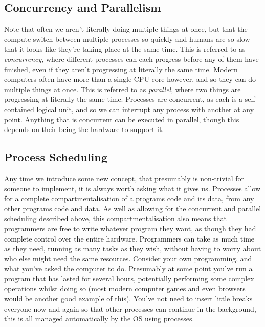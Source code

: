 \subsection{Concurrency and Parallelism}

Note that often we aren't literally doing multiple things at once, but that the compute switch between multiple processes so quickly and humans are so slow that it looks like they're taking place at the same time. This is referred to as \textit{concurrency}, where different processes can each progress before any of them have finished, even if they aren't progressing at literally the same time. Modern computers often have more than a single CPU core however, and so they can do multiple things at once. This is referred to as \textit{parallel}, where two things are progressing at literally the same time. Processes are concurrent, as each is a self contained logical unit, and so we can interrupt any process with another at any point. Anything that is concurrent can be executed in parallel, though this depends on their being the hardware to support it.

\subsection{Process Scheduling}

Any time we introduce some new concept, that presumably is non-trivial for someone to implement, it is always worth asking what it gives us. Processes allow for a complete compartmentalisation of a programs code and its data, from any other programs code and data. As well as allowing for the concurrent and parallel scheduling described above, this compartmentalisation also means that programmers are free to write whatever program they want, as though they had complete control over the entire hardware. Programmers can take as much time as they need, running as many tasks as they wish, without having to worry about who else might need the same resources. Consider your own programming, and what you've asked the computer to do. Presumably at some point you've run a program that has lasted for several hours, potentially performing some complex operations whilst doing so (most modern computer games and even browsers would be another good example of this). You've not need to insert little breaks everyone now and again so that other processes can continue in the background, this is all managed automatically by the OS using processes. 

